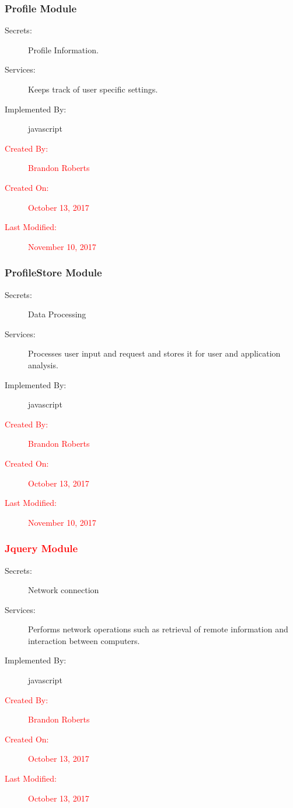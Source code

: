 \documentclass[12pt, titlepage]{article}
\begin{document}
\subsubsection{Profile Module}
\begin{description}
\item[Secrets:] Profile Information.
\item[Services:] Keeps track of user specific settings.
\item[Implemented By:] javascript
\item[\textcolor{red}{Created By:}] \textcolor{red}{Brandon Roberts}
\item[\textcolor{red}{Created On:}] \textcolor{red}{October 13, 2017}
\item[\textcolor{red}{Last Modified:}] \textcolor{red}{November 10, 2017}
\end{description}

\subsubsection{ProfileStore Module}
\begin{description}
\item[Secrets:] Data Processing
\item[Services:] Processes user input and request 	 and stores it for user and application analysis.
\item[Implemented By:] javascript
\item[\textcolor{red}{Created By:}] \textcolor{red}{Brandon Roberts}
\item[\textcolor{red}{Created On:}] \textcolor{red}{October 13, 2017}
\item[\textcolor{red}{Last Modified:}] \textcolor{red}{November 10, 2017}
\end{description}

\subsubsection{\textcolor{red}{Jquery Module}}
\begin{description}
\item[Secrets:] Network connection
\item[Services:] Performs network operations such as retrieval of remote information and interaction between computers.
\item[Implemented By:] javascript
\item[\textcolor{red}{Created By:}] \textcolor{red}{Brandon Roberts}
\item[\textcolor{red}{Created On:}] \textcolor{red}{October 13, 2017}
\item[\textcolor{red}{Last Modified:}] \textcolor{red}{October 13, 2017}
\end{description}
\end{document}
